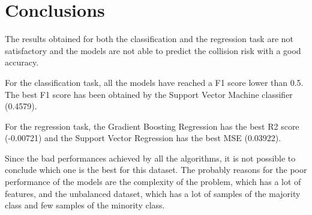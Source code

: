 \section{Conclusions}
The results obtained for both the classification and the regression task are not satisfactory and the models are not able to predict the collision risk with a good accuracy.

For the classification task, all the models have reached a F1 score lower than 0.5. The best F1 score has been obtained by the Support Vector Machine classifier (0.4579).

For the regression task, the Gradient Boosting Regression has the best R2 score (-0.00721) and the Support Vector Regression has the best MSE (0.03922).

Since the bad performances achieved by all the algorithms, it is not possible to conclude which one is the best for this dataset.
The probably reasons for the poor performance of the models are the complexity of the problem, which has a lot of features, and the unbalanced dataset, which has a lot of samples of the majority class and few samples of the minority class.